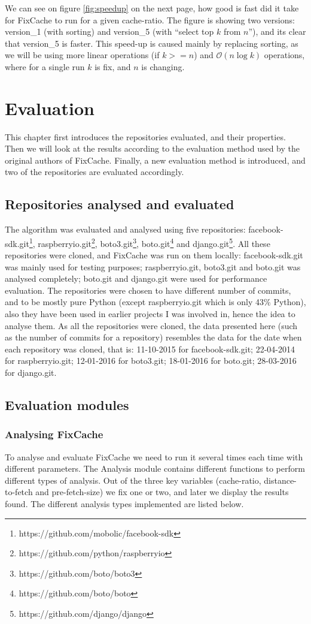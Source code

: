 \documentclass[12pt,twoside,notitlepage]{report}
\newcommand{\fxch}{FixCache}
\begin{document}
We can see on figure \ref{fig:speedup} on the next page, how good is fast did it take for \fxch{} to run for a given cache-ratio. The figure is showing two versions: version\_1 (with sorting) and version\_5 (with ``select top $k$ from $n$''), and its clear that version\_5 is faster.
This speed-up is caused mainly by replacing sorting, as we will be using more linear operations (if $k >= n$) and $\mathcal{O}(n\log{k})$ operations, where for a single run $k$ is fix, and $n$ is changing.
\cleardoublepage
\chapter{Evaluation}
This chapter first introduces the repositories evaluated, and their properties. Then we will look at the results according to the evaluation method used by the original authors of \fxch{}. Finally, a new evaluation method is introduced, and two of the repositories are evaluated accordingly. 
\section{Repositories analysed and evaluated}
The algorithm was evaluated and analysed using five repositories: facebook-sdk.git\footnote{https://github.com/mobolic/facebook-sdk}, raspberryio.git\footnote{https://github.com/python/raspberryio}, boto3.git\footnote{https://github.com/boto/boto3}, boto.git\footnote{https://github.com/boto/boto} and django.git\footnote{https://github.com/django/django}. All these repositories were cloned, and \fxch{} was run on them locally: facebook-sdk.git was mainly used for testing purposes; raspberryio.git, boto3.git and boto.git was analysed completely; boto.git and django.git were used for performance evaluation. The repositories were chosen to have different number of commits, and to be mostly pure Python (except raspberryio.git which is only 43\% Python), also they have been used in earlier projects I was involved in, hence the idea to analyse them.
\clearpage
As all the repositories were cloned, the data presented here (such as the number of commits for a repository) resembles the data for the date when each repository was cloned, that is: 11-10-2015 for facebook-sdk.git; 22-04-2014 for raspberryio.git; 12-01-2016 for boto3.git; 18-01-2016 for boto.git; 28-03-2016 for django.git.
\section{Evaluation modules}
\subsection{Analysing \fxch{}}
To analyse and evaluate \fxch{} we need to run it several times each time with different parameters. The Analysis module contains different functions to perform different types of analysis. Out of the three key variables (cache-ratio, distance-to-fetch and pre-fetch-size) we fix one or two, and later we display the results found. The different analysis types implemented are listed below.
\end{document}
